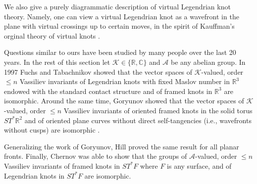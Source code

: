 We also give a purely diagrammatic description of virtual Legendrian knot theory.  Namely, one can view a virtual Legendrian knot as a wavefront in the plane with virtual crossings up to certain moves, in the spirit of Kauffman's orginal theory of virtual knots \cite{Kauffman}.  






Questions similar to ours have been studied by many people over the last 20 years.  In the rest of this section let $\mathcal{K}\in\{\mathbb{R}, \mathbb{C}\}$ and $\mathcal{A}$ be any abelian group.  In 1997 Fuchs and Tabachnikov \cite{f&t} showed that the vector spaces of $\mathcal{K}$-valued, order $\leq n$ Vassiliev invariants of Legendrian knots with fixed Maslov number in $\mathbb{R}^3$ endowed with the standard contact structure and of framed knots in $\mathbb{R}^3$ are isomorphic.  Around the same time, Goryunov showed that the vector spaces of $\mathcal{K}$-valued, order $\leq n$ Vassiliev invariants of oriented framed knots in the solid torus $ST^*\mathbb{R}^2$ and of oriented plane curves without direct self-tangencies (i.e., wavefronts without cusps) are isomorphic \cite{Goryunov}.


Generalizing the work of Goryunov, Hill \cite{Hill} proved the same result for all planar fronts.  Finally, Chernov \cite{Chernov} was able to show that the groups of $\mathcal{A}$-valued, order $\leq n$ Vassiliev invariants of framed knots in $ST^*F$ where $F$ is any surface, and of Legendrian knots in $ST^*F$ are isomorphic.  


